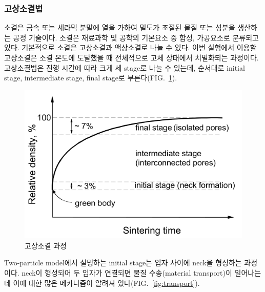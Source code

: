 \documentclass[aps,reprint,superscriptaddress,11pt]{revtex4-2}
\begin{document}
 
\subsubsection{고상소결법}

소결은 금속 또는 세라믹 분말에 열을 가하여 밀도가 조절된 물질 또는 성분을 생산하는 공정 
기술이다. 소결은 재료과학 및 공학의 기본요소 중 합성, 가공요소로 분류되고 있다.
기본적으로 소결은 고상소결과 액상소결로 나눌 수 있다. 이번 실험에서 이용할 고상소결은
소결 온도에 도달했을 때 전체적으로 고체 상태에서 치밀화되는 과정이다. 고상소결법은 
진행 시간에 따라 크게 세 stage로 나눌 수 있는데, 순서대로 initial stage, intermediate stage,
final stage로 부른다(FIG.~\ref{fig:sintering}).

\begin{figure}[htbp]
  \centering
  \includegraphics[scale=0.3]{sintering.png}
  \caption{고상소결 과정}\label{fig:sintering}
\end{figure}

Two-particle model에서 설명하는 initial stage는 입자 사이에 neck을 형성하는 과정이다.
neck이 형성되어 두 입자가 연결되면 물질 수송(material transport)이 일어나는데 이에 대한
많은 메카니즘이 알려져 있다(FIG.~\ref{fig:transport}).
\end{document}
